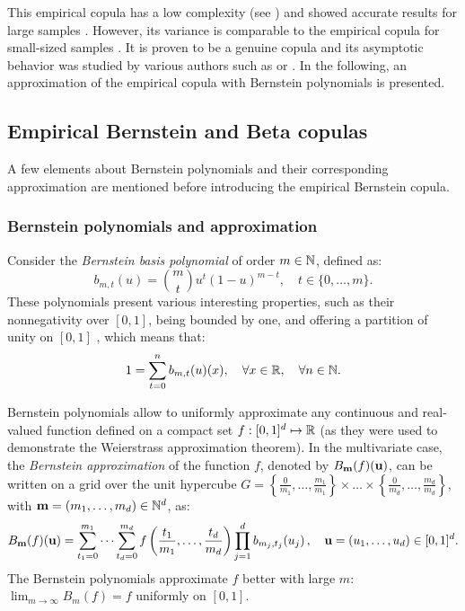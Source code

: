 This empirical copula has a low complexity (see \citealp{rose_2015}) and showed accurate results for large samples \citep{gonzalez_2021_checkerboard_copula}. 
However, its variance is comparable to the empirical copula for small-sized samples \citep{segers_2017}. 
It is proven to be a genuine copula and its asymptotic behavior was studied by various authors such as \citet{li_1998_checkerboard} or \citet{genest_2017_asymptotic_checkerboard}. 
In the following, an approximation of the empirical copula with Bernstein polynomials is presented. 



\subsection{Empirical Bernstein and Beta copulas}

A few elements about Bernstein polynomials and their corresponding approximation are mentioned before introducing the empirical Bernstein copula.

\subsubsection{Bernstein polynomials and approximation}
Consider the \textit{Bernstein basis polynomial} of order $m \in \mathbb{N}$, defined as: 
\begin{equation}
    b_{m, t}(u)= \binom{m}{t}u^t(1-u)^{m-t}, \quad t \in \{0, \dots, m\}.
\end{equation}
These polynomials present various interesting properties, such as their nonnegativity over $[0, 1]$, being bounded by one, and offering a partition of unity on $[0, 1]$ \citep{lasserre_2023_bernstein}, which means that: 
\begin{equation}
    1 = \sum_{t=0}^{n} b_{m, t}(u)(x), \quad \forall x\in\mathbb{R}, \quad \forall n \in \mathbb{N}.
\end{equation} 

Bernstein polynomials allow to uniformly approximate any continuous and real-valued function defined on a compact set $f: [0, 1]^d \mapsto \mathbb{R}$ (as they were used to demonstrate the Weierstrass approximation theorem). 
In the multivariate case, the \textit{Bernstein approximation} of the function $f$, denoted by $B_{{\bf m}}(f)({\bf u})$, can be written on a grid over the unit hypercube $G=\left\{\frac{0}{m_1}, \dots, \frac{m_1}{m_1}\right\} \times \dots \times \left\{\frac{0}{m_d}, \dots, \frac{m_d}{m_d}\right\}$, with ${\bf m} = (m_1, \dots, m_d) \in \mathbb{N}^d$, as: 
\begin{equation}
    B_{{\bf m}}(f)({\bf u}) = \sum_{t_1=0}^{m_1} \dots \sum_{t_d=0}^{m_d} f\left(\frac{t_1}{m_1}, \dots, \frac{t_d}{m_d}\right) \prod_{j=1}^d b_{m_j, t_j}(u_j) \, , \quad  {\bf u} = (u_1, \dots, u_d) \in [0, 1]^d.
    \label{eq:bernstein_approx}
\end{equation}
The Bernstein polynomials approximate $f$ better with large $m$: $\lim_{m\to\infty} B_{m}(f) = f$ uniformly on $\left[0,1\right]$. 


